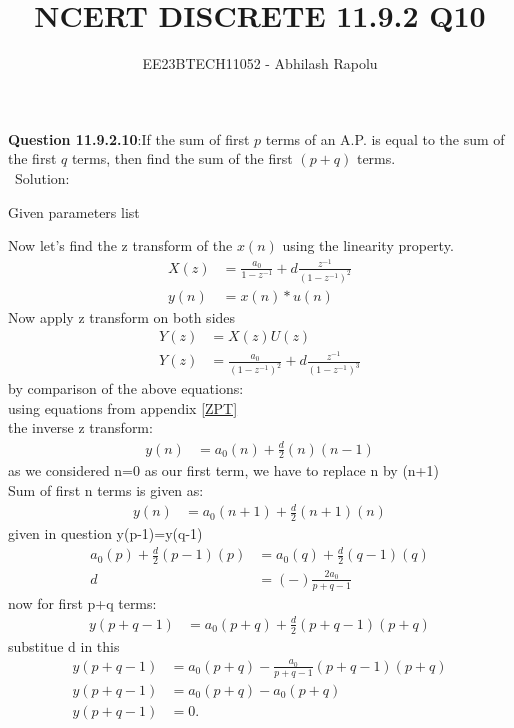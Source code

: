 \documentclass[journal,12pt,twocolumn]{IEEEtran}
\title{NCERT DISCRETE 11.9.2 Q10}
\author{EE23BTECH11052 - Abhilash Rapolu }
\begin{document}
\maketitle
\newpage
\textbf{Question 11.9.2.10}:If the sum of first $p$ terms of an A.P. is equal to the sum of the first $q$ terms, then
find the sum of the first $(p + q)$ terms.\\
\ Solution:
\begin{table}[htbp]
\centering

\caption{Given parameters list}
\end{table}
Now let's find the z transform of the $x(n)$ using the linearity property.\\
\begin{align}
X(z)&=\frac{a_0}{1-z^{-1}}+d\frac{z^{-1}}{(1-z^{-1})^2}\\
y(n) &= x(n)*u(n)
\end{align}
Now apply z transform on both sides\\
\begin{align}
Y(z)&=X(z)U(z)\\
Y(z)&=\frac{a_0}{(1-z^{-1})^2}+d\frac{z^{-1}}{(1-z^{-1})^3}
\end{align}
by comparison of the above equations:\\
using equations from appendix  \eqref{ZPT}\\
the inverse z transform:\\
\begin{align}
y(n)&=a_0(n)+\frac{d}{2}(n)(n-1)
\end{align}
as we considered n=0 as our first term, we have to replace n by (n+1)\\
Sum of first n terms is given as:\\
\begin{align}
y(n)&=a_0(n+1)+\frac{d}{2}(n+1)(n)
\end{align}
given in question y(p-1)=y(q-1)\\
\begin{align}
a_0(p)+\frac{d}{2}(p-1)(p)&=a_0(q)+\frac{d}{2}(q-1)(q)\\
d&=(-)\frac{2a_0}{p+q-1}
\end{align}
now for first p+q terms:\\
\begin{align}
y(p+q-1)&=a_0(p+q)+\frac{d}{2}(p+q-1)(p+q)
\end{align}
substitue d in this\\
\begin{align}
y(p+q-1)&=a_0(p+q)-\frac{a_0}{p+q-1}(p+q-1)(p+q)\\
y(p+q-1)&=a_0(p+q)-a_0(p+q)\\
y(p+q-1)&=0.
\end{align}
\end{document}
